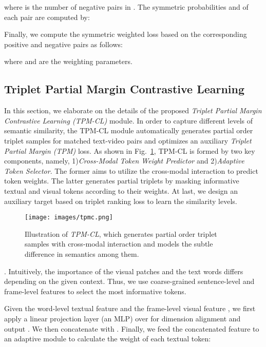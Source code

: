 \documentclass[sigconf]{acmart}
\begin{document}
where  is the number of negative pairs in . The symmetric probabilities  and  of each pair  are computed by: 




Finally, we compute the symmetric weighted loss based on the corresponding positive and negative pairs as follows:



where  and  are the weighting parameters.


\subsection{Triplet Partial Margin Contrastive Learning}\label{subsec:TPM-CL}
In this section, we elaborate on the details of the proposed \textit{Triplet Partial Margin Contrastive Learning (TPM-CL)} module. In order to capture different levels of semantic similarity, the TPM-CL module automatically generates partial order triplet samples for matched text-video pairs and optimizes an auxiliary \textit{Triplet Partial Margin (TPM)} loss. As shown in Fig.~\ref{fig:TPM-CL_diagram}, TPM-CL is formed by two key components, namely, 1)\textit{Cross-Modal Token Weight Predictor} and 2)\textit{Adaptive Token Selector}. The former aims to utilize the cross-modal interaction to predict token weights. The latter generates partial triplets by masking informative textual and visual tokens according to their weights. At last, we design an auxiliary target based on triplet ranking loss to learn the similarity levels.

\begin{figure}[ht!] \centering
  \texttt{[image: images/tpmc.png]}
  \caption{Illustration of \textit{TPM-CL}, which generates partial order triplet samples with cross-modal interaction and models the subtle difference in semantics among them.}
  \label{fig:TPM-CL_diagram}
\end{figure}

. Intuitively, the importance of the visual patches and the text words differs depending on the given context. Thus, we use coarse-grained sentence-level and frame-level features to select the most informative tokens. 

Given the word-level textual feature  and the frame-level visual feature , we first apply a linear projection layer (an MLP) over  for dimension alignment and output . 
We then concatenate  with . Finally, we feed the concatenated feature to an adaptive module  to calculate the weight of each textual token:
\end{document}
